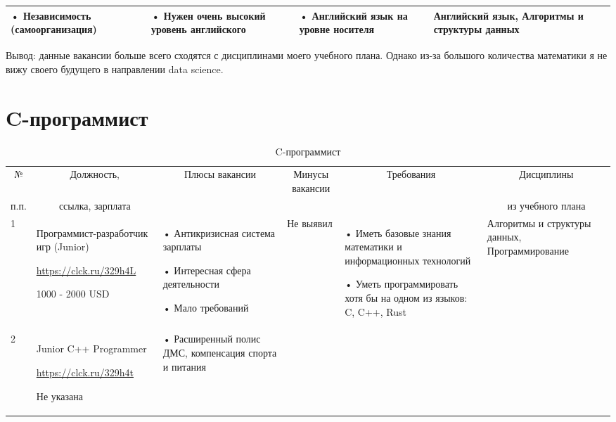 \documentclass[14pt]{extreport}
\begin{document}
\begin{landscape}
\begin{table}[H]
\begin{center}
\begin{small}
\begin{tabular}{|p{0.1cm}|p{5cm}|p{4.5cm}|p{4.5cm}|p{4cm}|p{3cm}|}
			• Независимость (самоорганизация)
			&
			• Нужен очень высокий уровень английского
			&
			• Английский язык на уровне носителя
			&
			Английский язык, Алгоритмы и структуры данных
			\\
			\hline
			\end{tabular}
		\end{small}
	\end{center}
\end{table}	
Вывод: данные вакансии больше всего сходятся с дисциплинами моего учебного плана. Однако из-за большого количества математики я не вижу своего будущего в направлении data science.
\begin{table}[H]
    \caption{C-программист}\section{C-программист}
	\begin{center}
		\begin{small}
		\begin{tabular}{|p{0.1cm}|p{5cm}|p{4.5cm}|p{4.5cm}|p{4cm}|p{3cm}|} \hline
			\multicolumn{1}{|c|}{№}&\multicolumn{1}{c|}{Должность,}&\multicolumn{1}{c|}{Плюсы вакансии}&\multicolumn{1}{c|}{Минусы вакансии}&\multicolumn{1}{c|}{Требования}&\multicolumn{1}{c|}{Дисциплины}\\ 
			\multicolumn{1}{|c|}{п.п.}&\multicolumn{1}{c|}{ссылка, зарплата}&\multicolumn{1}{c|}{}&\multicolumn{1}{c|}{}&\multicolumn{1}{c|}{}&\multicolumn{1}{c|}{из учебного плана}\\ 
			\hline
				
				1 & Программист-разработчик игр (Junior)
				
				\url{https://clck.ru/329h4L}
				
				1000 - 2000 USD &
				 • Антикризисная система зарплаты
				 
				 • Интересная сфера деятельности
				 
				 • Мало требований
				 &
				 Не выявил
				 &
				 • Иметь базовые знания математики и информационных технологий
				  
				 • Уметь программировать хотя бы на одном из языков: C, C++, Rust
				 &
				 Алгоритмы и структуры данных, Программирование
				\\
				\hline
				2 & Junior C++ Programmer
				
				\url{https://clck.ru/329h4t}
				
				Не указана	&
				 • Расширенный полис ДМС, компенсация спорта и питания
				

\end{tabular}
\end{small}
\end{center}
\end{table}
\end{landscape}
\end{document}
